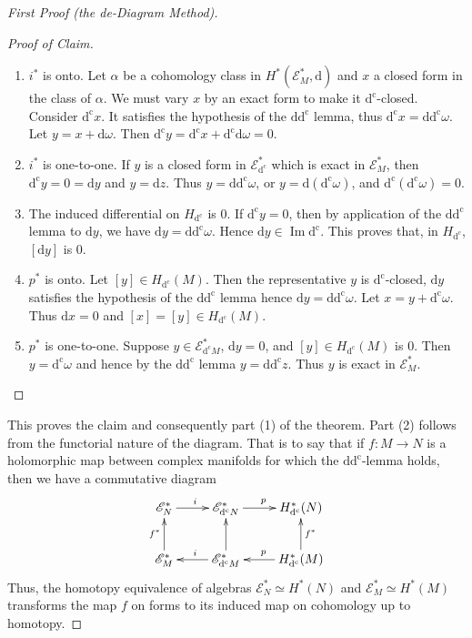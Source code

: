 \documentclass[11pt]{amsart}
\theoremstyle{plain}
\theoremstyle{definition}
\DeclareMathOperator{\Imop}{Im}
\newcommand{\sE}{\mathscr{E}}
\newcommand{\dd}{\mathrm{d}}
\newcommand{\dc}{\mathrm{d}^{\mathrm{c}}}
\begin{document}
\begin{proof}[First Proof (the de-Diagram Method)]
\begin{proof}[Proof of Claim]
\begin{enumerate}
\item[(a)] $i^{*}$ is onto. Let $\alpha$ be a cohomology class in $H^{*}(\sE^{*}_{M}, \dd)$ and $x$ a closed form in the class of $\alpha$. We must vary $x$ by an exact form to make it $\dc$-closed. Consider $\dc x$. It satisfies the hypothesis of the $\dd\dc$ lemma, thus $\dc x = \dd\dc \omega$. Let $y = x + \dd\omega$. Then $\dc y = \dc x + \dc \dd\omega = 0$.
\item[(b)] $i^{*}$ is one-to-one. If $y$ is a closed form in $\sE^{*}_{\dc}$ which is exact in $\sE^{*}_{M}$, then $\dc y = 0 = \dd y$ and $y = \dd z$. Thus $y = \dd\dc \omega$, or $y = \dd(\dc\omega)$, and $\dc(\dc\omega) = 0$.
\item[(c)] The induced differential on $H_{\dc}$ is $0$. If $\dc y = 0$, then by application of the $\dd\dc$ lemma to $\dd y$, we have $\dd y = \dd\dc\omega$. Hence $\dd y \in \Imop \dc$. This proves that, in $H_{\dc}$, $[\dd y]$ is $0$.
\item[(d)] $p^{*}$ is onto. Let $[y] \in H_{\dc}(M)$. Then the representative $y$ is $\dc$-closed, $\dd y$ satisfies the hypothesis of the $\dd\dc$ lemma hence $\dd y = \dd\dc\omega$. Let $x = y + \dc\omega$. Thus $\dd x = 0$ and $[x] = [y] \in H_{\dc}(M)$.
\item[(e)] $p^{*}$ is one-to-one. Suppose $y \in \sE^{*}_{\dc M}$, $\dd y = 0$, and $[y] \in H_{\dc}(M)$ is $0$. Then $y = \dc\omega$ and hence by the $\dd\dc$ lemma $y = \dd\dc z$. Thus $y$ is exact in $\sE^{*}_{M}$.
\end{enumerate}
\end{proof}
This proves the claim and consequently part (1) of the theorem. Part (2) follows from the functorial nature of the diagram. That is to say that if $f \colon M \to N$ is a holomorphic map between complex manifolds for which the $\dd\dc$-lemma holds, then we have a commutative diagram
\[
\xymatrix{
\sE^{*}_{N} \ar[r]^{i} & \sE^{*}_{\dc N} \ar[r]^{p} & H^{*}_{\dc}(N) \\
\sE^{*}_{M} \ar[u]^{f^{*}} & \sE^{*}_{\dc M} \ar[u] \ar[l]_{i} & H^{*}_{\dc}(M) \ar[l]_{p} \ar[u]_{f^{*}}
}
\]
Thus, the homotopy equivalence of algebras $\sE^{*}_{N} \simeq H^{*}(N)$ and $\sE^{*}_{M} \simeq H^{*}(M)$ transforms the map $f$ on forms to its induced map on cohomology up to homotopy.
\end{proof}
\end{document}
